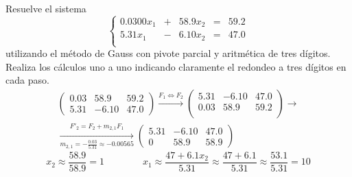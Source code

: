 \documentclass[12pt]{article}
\begin{document}
\begin{ejercicio} 
    Resuelve el sistema
    \begin{equation*}
        \left\{ \begin{array}{rrrrr}
            0.0300x_1 & + & 58.9x_2 &=& 59.2  \\
            5.31x_1 & - & 6.10 x_2 &=&  47.0 \\
        \end{array}\right.
    \end{equation*}
    utilizando el método de Gauss con pivote parcial y aritmética de tres dígitos. Realiza los cálculos uno a uno indicando claramente el redondeo a tres dígitos en cada paso.
    \begin{multline*}
        \left( \begin{array}{cc|c}
            0.03 & 58.9 & 59.2 \\
            5.31 & -6.10 & 47.0
        \end{array}\right)
        \xrightarrow{F_1 \Longleftrightarrow F_2}
        \left( \begin{array}{cc|c}
            5.31 & -6.10 & 47.0\\
            0.03 & 58.9 & 59.2 \\
        \end{array}\right)
        \longrightarrow \\
        \xrightarrow[m_{2,1} = -\frac{0.03}{5.31}\approx -0.00565]{F'_2 = F_2 + m_{2,1}F_1}
        \left( \begin{array}{cc|c}
            5.31 & -6.10 & 47.0\\
            0 & 58.9 & 58.9
        \end{array}\right)
    \end{multline*}
    \begin{equation*}
        x_2 \approx \frac{58.9}{58.9} =1 \qquad \qquad x_1 \approx \frac{47+6.1x_2}{5.31} \approx \frac{47+6.1}{5.31} \approx \frac{53.1}{5.31} =10
    \end{equation*}
\end{ejercicio}
\end{document}
